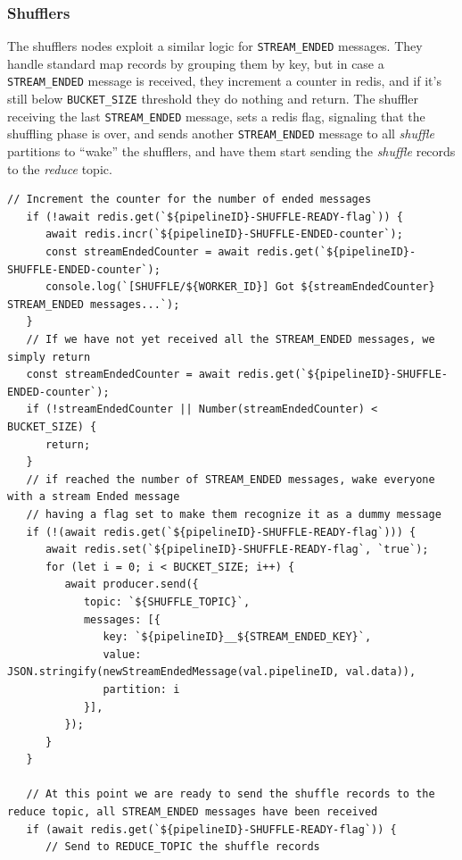 \subsubsection{Shufflers}
The shufflers nodes exploit a similar logic for \lstinline|STREAM_ENDED| messages. 
They handle standard map records by grouping them by key, but in case a \lstinline|STREAM_ENDED| message is received, they increment a counter in redis, and if it's still below \lstinline|BUCKET_SIZE| threshold they do nothing and return.
The shuffler receiving the last \lstinline|STREAM_ENDED| message, sets a redis flag, signaling that the shuffling phase is over, and sends another \lstinline|STREAM_ENDED| message to all \textit{shuffle} partitions to ``wake'' the shufflers, and have them start sending the \textit{shuffle} records to the \textit{reduce} topic.

\begin{lstlisting}[label={lst:streamEndedShuffler}, caption={Handling the STREAM\_ENDED message in a shuffler},captionpos={top}]
   // Increment the counter for the number of ended messages
   if (!await redis.get(`${pipelineID}-SHUFFLE-READY-flag`)) {
      await redis.incr(`${pipelineID}-SHUFFLE-ENDED-counter`);
      const streamEndedCounter = await redis.get(`${pipelineID}-SHUFFLE-ENDED-counter`);
      console.log(`[SHUFFLE/${WORKER_ID}] Got ${streamEndedCounter} STREAM_ENDED messages...`);
   }
   // If we have not yet received all the STREAM_ENDED messages, we simply return
   const streamEndedCounter = await redis.get(`${pipelineID}-SHUFFLE-ENDED-counter`);
   if (!streamEndedCounter || Number(streamEndedCounter) < BUCKET_SIZE) {
      return;
   }
   // if reached the number of STREAM_ENDED messages, wake everyone with a stream Ended message 
   // having a flag set to make them recognize it as a dummy message
   if (!(await redis.get(`${pipelineID}-SHUFFLE-READY-flag`))) {
      await redis.set(`${pipelineID}-SHUFFLE-READY-flag`, `true`);
      for (let i = 0; i < BUCKET_SIZE; i++) {
         await producer.send({
            topic: `${SHUFFLE_TOPIC}`,
            messages: [{
               key: `${pipelineID}__${STREAM_ENDED_KEY}`,
               value: JSON.stringify(newStreamEndedMessage(val.pipelineID, val.data)),
               partition: i
            }],
         });
      }
   }
  
   // At this point we are ready to send the shuffle records to the reduce topic, all STREAM_ENDED messages have been received
   if (await redis.get(`${pipelineID}-SHUFFLE-READY-flag`)) {
      // Send to REDUCE_TOPIC the shuffle records
\end{lstlisting}

